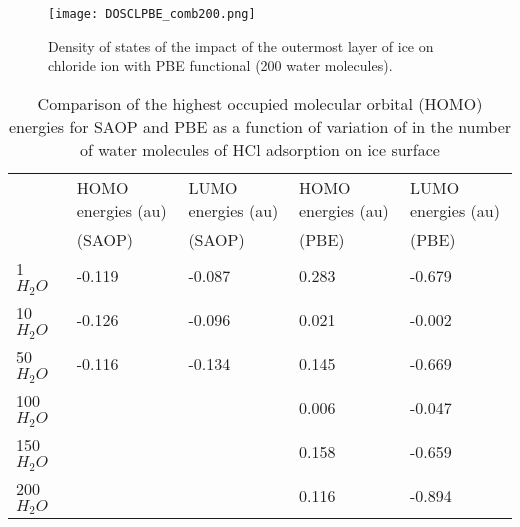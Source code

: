 \documentclass[a4paper,11pt]{report}
\begin{document}
\begin{figure}[H]\large
\texttt{[image: DOSCLPBE\_comb200.png]}
\caption{Density of states of the impact of the outermost layer of ice on chloride ion with PBE functional (200 water molecules).}
\label{figure4b}
\end{figure}

\begin{table}[H]\small
\begin{center}
\caption{Comparison of the highest occupied molecular orbital (HOMO) energies for SAOP and PBE as a function of variation of in the number of water molecules of HCl adsorption on ice surface} \label{tab:1}
\begin{tabular}{|l|l|l|l|l|}
\hline
&HOMO energies (au)&LUMO energies (au)&HOMO energies (au)&LUMO energies (au) \\
&\hspace*{1.0cm}(SAOP)&\hspace*{1.0cm}(SAOP)&\hspace*{1.0cm}(PBE)&\hspace*{1.0cm}(PBE)\\ 
\hline
1 $H_{2}O$&\hspace*{1.0cm}-0.119&\hspace*{1.0cm}-0.087&\hspace*{1.0cm}0.283&\hspace*{1.0cm}-0.679\\
\hline
10 $H_{2}O$&\hspace*{1.0cm}-0.126&\hspace*{1.0cm}-0.096&\hspace*{1.0cm}0.021&\hspace*{1.0cm}-0.002\\
\hline
50 $H_{2}O$&\hspace*{1.0cm}-0.116&\hspace*{1.0cm}-0.134&\hspace*{1.0cm}0.145&\hspace*{1.0cm}-0.669\\
\hline
100 $H_{2}O$&&&\hspace*{1.0cm}0.006&\hspace*{1.0cm}-0.047\\
\hline
150 $H_{2}O$&&&\hspace*{1.0cm}0.158&\hspace*{1.0cm}-0.659\\
\hline
200 $H_{2}O$&&&\hspace*{1.0cm}0.116&\hspace*{1.0cm}-0.894\\
\hline
\end{tabular}
\label{table1}
\end{center}
\end{table}
\end{document}
